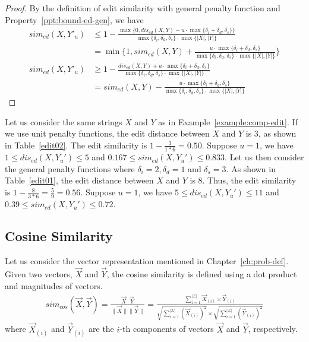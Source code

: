 \begin{proof}
By the definition of edit similarity with general penalty function and Property~\ref{ppt:bound-ed-gen}, we have 
\begin{align*} 
sim_{ed}(X, Y'_u) &\leq 1 - \frac{\max\{0, dis_{ed}(X, Y) - u \cdot \max\{\delta_i + \delta_d, \delta_s\} \}}{\max\{\delta_i, \delta_d, \delta_s\} \cdot \max\{|X|, |Y|\}}\\
&=\min\{1, sim_{ed}(X,Y)+\frac{u \cdot \max\{\delta_i + \delta_d, \delta_s\}}{\max\{\delta_i, \delta_d, \delta_s\} \cdot \max\{|X|, |Y|\}}\}\\
sim_{ed}(X, Y'_u) &\geq 1 - \frac{dis_{ed}(X, Y) + u \cdot \max\{\delta_i + \delta_d, \delta_s\}}{\max\{\delta_i, \delta_d, \delta_s\} \cdot \max\{|X|, |Y|\}}\\
&= sim_{ed}(X, Y)-\frac{u\cdot \max\{\delta_i + \delta_d, \delta_s\}}{\max\{\delta_i, \delta_d, \delta_s\} \cdot \max\{|X|, |Y|\}}
\end{align*}
\end{proof}


\begin{example}\label{example:bound-ed}
Let us consider the same strings $X$ and $Y$ as in Example~\ref{example:comp-edit}. If we use unit penalty functions, the edit distance between $X$ and $Y$ is $3$, as shown in Table~\ref{edit02}. The edit similarity is $1-\frac{3}{1*6}=0.50$. Suppose $u=1$, we have $1 \leq dis_{ed}(X, Y_u') \leq 5$ and $0.167 \leq sim_{ed}(X, Y_u') \leq 0.833$. Let us then consider the general penalty functions where $\delta_i = 2, \delta_d = 1$ and $\delta_s = 3$. As shown in Table~\ref{edit01}, the edit distance between $X$ and $Y$ is $8$. Thus, the edit similarity is $1-\frac{8}{3*6} = \frac{5}{9} = 0.56$. Suppose $u=1$, we have $5 \leq dis_{ed}(X, Y_u') \leq 11$ and $0.39 \leq sim_{ed}(X, Y_u') \leq 0.72$.       
\end{example}


\subsection{Cosine Similarity} 
\begin{definition}\label{def:cosine}
Let us consider the vector representation mentioned in Chapter~\ref{ch:prob-def}. Given two vectors, $\vec{X}$ and $\vec{Y}$, the cosine similarity is defined using a dot product and magnitudes of vectors. 
\begin{align*}   
sim_{cos}(\vec{X}, \vec{Y}) =\frac{\vec{X} \cdot \vec{Y}} {\| \vec{X} \| \| \vec{Y} \|}=\frac{\sum_{i=1}^{|\Sigma|}\vec{X}_{(i)} \times \vec{Y}_{(i)}}{\sqrt{\sum_{i=1}^{|\Sigma|}(\vec{X}_{(i)})^2} \times \sqrt{\sum_{i=1}^{|\Sigma|}(\vec{Y}_{(i)})^2}}
\end{align*}  
where $\vec{X}_{(i)}$ and $\vec{Y}_{(i)}$ are the $i$-th components of vectors $\vec{X}$ and $\vec{Y}$, respectively.  
\end{definition}

